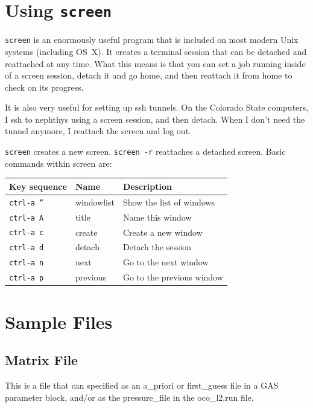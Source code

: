 \documentclass{article}
\begin{document}
\section{Using \texttt{screen}}

\texttt{screen} is an enormously useful program that is included on
most modern Unix systems (including OS~X).  It creates a terminal
session that can be detached and reattached at any time.  What this
means is that you can set a job running inside of a screen session,
detach it and go home, and then reattach it from home to check on its
progress.

It is also very useful for setting up ssh tunnels.  On the Colorado
State computers, I ssh to nephthys using a screen session, and then
detach.  When I don't need the tunnel anymore, I reattach the screen
and log out.

\texttt{screen} creates a new screen. \texttt{screen -r} reattaches a
detached screen.  Basic commands within screen are:

\begin{tabular}{|l|l|l|}
\hline
Key sequence & Name & Description\\
\hline
\texttt{ctrl-a ''} & windowlist & Show the list of windows\\
\texttt{ctrl-a A} & title & Name this window\\
\texttt{ctrl-a c} & create & Create a new window\\
\texttt{ctrl-a d} & detach & Detach the session\\
\texttt{ctrl-a n} & next & Go to the next window \\
\texttt{ctrl-a p} & previous & Go to the previous window\\
\hline
\end{tabular}

\section{Sample Files}

\subsection{Matrix File}

This is a file that can specified as an a\_priori or first\_guess file in a GAS parameter block, and/or as the pressure\_file in the oco\_l2.run file.
\end{document}
